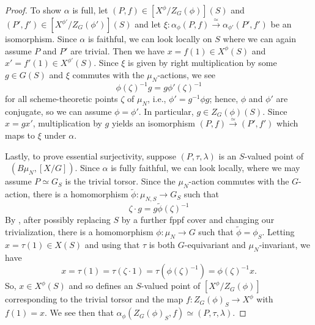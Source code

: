 \documentclass[12pt,a4paper]{amsart}
\theoremstyle{definition}
\renewcommand{\1}{\textbf{1}}
\newcommand{\<}{\langle}
\renewcommand{\>}{\rangle}
\DeclareMathOperator{\Hom}{Hom}
\DeclareMathOperator{\uHom}{\underline{\Hom}}
\begin{document}
\begin{proof}
To show $\alpha$ is full, let $(P,f)\in[X^\phi/Z_G(\phi)](S)$ and $(P',f')\in[X^{\phi'}/Z_G(\phi')](S)$ and let $\xi\colon\alpha_\phi(P,f)\xrightarrow{\simeq}\alpha_{\phi'}(P',f')$ be an isomorphism. Since $\alpha$ is faithful, we can look locally on $S$ where we can again assume $P$ and $P'$ are trivial. Then we have $x=f(1)\in X^\phi(S)$ and $x'=f'(1)\in X^{\phi'}(S)$. Since $\xi$ is given by right multiplication by some $g\in G(S)$ and $\xi$ commutes with the $\mu_N$-actions, we see
\[
	\phi(\zeta)^{-1}g=g\phi'(\zeta)^{-1}
\]
for all scheme-theoretic points $\zeta$ of $\mu_N$, i.e., $\phi'=g^{-1}\phi g$; hence, $\phi$ and $\phi'$ are conjugate, so we can assume $\phi=\phi'$. In particular, $g\in Z_G(\phi)(S)$. Since $x=gx'$, multiplication by $g$ yields an isomorphism $(P,f)\xrightarrow{\simeq}(P',f')$ which maps to $\xi$ under $\alpha$.

Lastly, to prove essential surjectivity, suppose $(P,\tau,\lambda)$ is an $S$-valued point of $\uHom(B\mu_N,[X/G])$. Since $\alpha$ is fully faithful, we can look locally, where we may assume $P\simeq G_S$ is the trivial torsor. Since the $\mu_N$-action commutes with the $G$-action, there is a homomorphism $\widetilde{\phi}\colon\mu_{N,S}\to G_S$ such that
\[
    \zeta\cdot g=g\widetilde{\phi}(\zeta)^{-1}
\]
By \cite[Lemma 10.4]{HuangSatrianoUsatine}, after possibly replacing $S$ by a further fppf cover and changing our trivialization, there is a homomorphism $\phi\colon\mu_N\to G$ such that $\widetilde{\phi}=\phi_S$. Letting $x=\tau(1)\in X(S)$ and using that $\tau$ is both $G$-equivariant and $\mu_N$-invariant, we have
\[
    x=\tau(1)=\tau(\zeta\cdot1)=\tau(\phi(\zeta)^{-1})=\phi(\zeta)^{-1}x.
\]
So, $x\in X^\phi(S)$ and so defines an $S$-valued point of $[X^\phi/Z_G(\phi)]$ corresponding to the trivial torsor and the map $f\colon Z_G(\phi)_S\to X^\phi$ with $f(1)=x$. We see then that $\alpha_\phi(Z_G(\phi)_S,f)\simeq (P,\tau,\lambda)$.
\end{proof}
\end{document}
